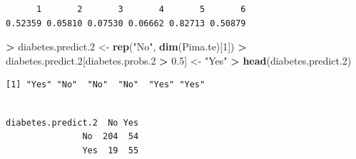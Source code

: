 \documentclass[
]{krantz}
\makeatletter
\newenvironment{Shaded}{\begin{snugshade}}{\end{snugshade}}
\newcommand{\DecValTok}[1]{\textcolor[rgb]{0.06,0.06,0.06}{#1}}
\newcommand{\FloatTok}[1]{\textcolor[rgb]{0.06,0.06,0.06}{#1}}
\newcommand{\KeywordTok}[1]{\textcolor[rgb]{0.27,0.27,0.27}{\textbf{#1}}}
\newcommand{\NormalTok}[1]{#1}
\newcommand{\OperatorTok}[1]{\textcolor[rgb]{0.43,0.43,0.43}{\textbf{#1}}}
\newcommand{\StringTok}[1]{\textcolor[rgb]{0.5,0.5,0.5}{#1}}
\newenvironment{kframe}{%
\medskip{}
\setlength{\fboxsep}{.8em}
 \def\at@end@of@kframe{}%
 \ifinner\ifhmode%
  \def\at@end@of@kframe{\end{minipage}}%
  \begin{minipage}{\columnwidth}%
 \fi\fi%
 \def\FrameCommand##1{\hskip\@totalleftmargin \hskip-\fboxsep
 \colorbox{shadecolor}{##1}\hskip-\fboxsep
     \hskip-\linewidth \hskip-\@totalleftmargin \hskip\columnwidth}%
 \MakeFramed {\advance\hsize-\width
   \@totalleftmargin\z@ \linewidth\hsize
   \@setminipage}}%
 {\par\unskip\endMakeFramed%
 \at@end@of@kframe}
\renewenvironment{Shaded}{\begin{kframe}}{\end{kframe}}
\makeatother
\begin{document}
\begin{verbatim}
      1       2       3       4       5       6 
0.52359 0.05810 0.07530 0.06662 0.82713 0.50879 
\end{verbatim}

\begin{Shaded}
\begin{Highlighting}[]
\OperatorTok{\textgreater{}}\StringTok{ }\NormalTok{diabetes.predict}\FloatTok{.2}\NormalTok{ \textless{}{-}}\StringTok{ }\KeywordTok{rep}\NormalTok{(}\StringTok{"No"}\NormalTok{, }\KeywordTok{dim}\NormalTok{(Pima.te)[}\DecValTok{1}\NormalTok{])}
\OperatorTok{\textgreater{}}\StringTok{ }\NormalTok{diabetes.predict}\FloatTok{.2}\NormalTok{[diabetes.probs}\FloatTok{.2} \OperatorTok{\textgreater{}}\StringTok{ }\FloatTok{0.5}\NormalTok{] \textless{}{-}}\StringTok{ "Yes"}
\OperatorTok{\textgreater{}}\StringTok{ }\KeywordTok{head}\NormalTok{(diabetes.predict}\FloatTok{.2}\NormalTok{)}
\end{Highlighting}
\end{Shaded}

\begin{verbatim}
[1] "Yes" "No"  "No"  "No"  "Yes" "Yes"
\end{verbatim}

\begin{Shaded}
\end{Shaded}

\begin{verbatim}
                  
diabetes.predict.2  No Yes
               No  204  54
               Yes  19  55
\end{verbatim}

\begin{Shaded}
\end{Shaded}
\end{document}
